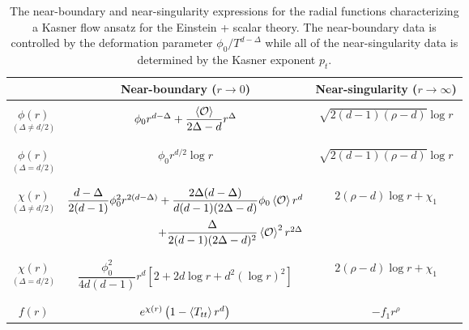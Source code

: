 \begin{table}
\centering
\begin{tabular}{c||c|c}{}
& Near-boundary ($r \to 0$) & Near-singularity ($r \to \infty$)\\\hline\hline & & \vspace{-1em}\\
$\underset{(\Delta \neq d/2)}{\phi(r)}$ & $\phi_0 r^{d-\Delta} + \dfrac{\expval{\mathcal{O}}}{2\Delta - d} r^\Delta$ & $\sqrt{2(d-1)(\rho - d)}\log r$\\ & & \vspace{-1em}\\ \hline & &\vspace{-1em}\\
$\underset{(\Delta = d/2)}{\phi(r)}$ & $\phi_0 r^{d/2}\log r$ & $\sqrt{2(d-1)(\rho - d)}\log r$\\ & & \vspace{-1em}\\ \hline & &\vspace{-1em}\\
$\underset{(\Delta \neq d/2)}{\chi(r)}$ & $\dfrac{d-\Delta}{2(d-1)}\phi_0^2 r^{2(d-\Delta)} + \dfrac{2\Delta(d-\Delta)}{d(d-1)(2\Delta - d)}\phi_0\expval{\mathcal{O}}r^d$ & $2(\rho-d) \log r + \chi_1$\\
& $ \qquad\qquad\qquad\qquad+ \dfrac{\Delta}{2(d-1)(2\Delta-d)^2}\expval{\mathcal{O}}^2 r^{2\Delta}$ & \\ & & \vspace{-1em}\\ \hline & &\vspace{-1em}\\
$\underset{(\Delta = d/2)}{\chi(r)}$ & $\dfrac{\phi_0^2}{4d(d-1)} r^d \left[2 + 2d\log r + d^2 (\log r)^2\right]$ & $2(\rho-d) \log r + \chi_1$\\ & & \vspace{-1em}\\ \hline & &\vspace{-1em}\\
$f(r)$ & $e^{\chi(r)}\left(1 - \expval{T_{tt}}r^d\right)$ & $-f_1 r^{\rho}$
\end{tabular}
\caption{The near-boundary and near-singularity expressions for the radial functions characterizing a Kasner flow ansatz for the Einstein + scalar theory. The near-boundary data is controlled by the deformation parameter $\phi_0/T^{d-\Delta}$ while all of the near-singularity data is determined by the Kasner exponent $p_t$.}
\label{tables:asymptoticExpressions}
\end{table}